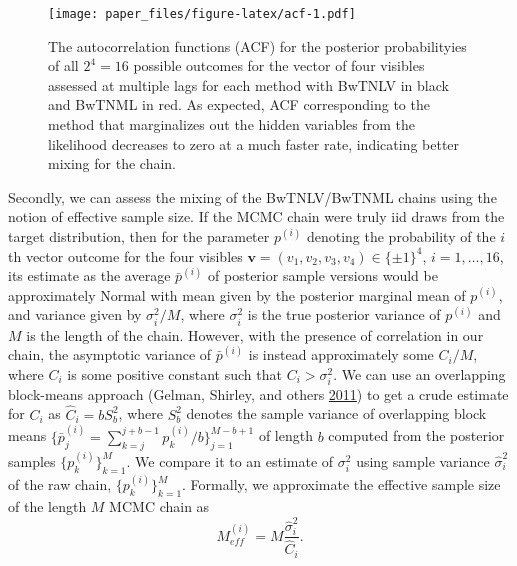 \documentclass[]{article}
\theoremstyle{definition}
\begin{document}
\par
\begin{figure}
\centering
\texttt{[image: paper\_files/figure-latex/acf-1.pdf]}
\caption{\label{fig:acf}The autocorrelation functions (ACF) for the
posterior probabilityies of all \(2^4 = 16\) possible outcomes for the
vector of four visibles assessed at multiple lags for each method with
BwTNLV in black and BwTNML in red. As expected, ACF corresponding to the
method that marginalizes out the hidden variables from the likelihood
decreases to zero at a much faster rate, indicating better mixing for
the chain.}
\end{figure}
Secondly, we can assess the mixing of the BwTNLV/BwTNML chains using the
notion of effective sample size. If the MCMC chain were truly iid draws
from the target distribution, then for the parameter \(p^{(i)}\)
denoting the probability of the \(i\)th vector outcome for the four
visibles \(\mathbf{v}=(v_1,v_2,v_3,v_4)\in\{\pm 1\}^4\),
\(i=1,\ldots,16\), its estimate as the average \(\bar{p}^{(i)}\) of
posterior sample versions would be approximately Normal with mean given
by the posterior marginal mean of \(p^{(i)}\), and variance given by
\(\sigma^2_i/M\), where \(\sigma^2_i\) is the true posterior variance of
\(p^{(i)}\) and \(M\) is the length of the chain. However, with the
presence of correlation in our chain, the asymptotic variance of
\(\bar{p}^{(i)}\) is instead approximately some \(C_i/M\), where \(C_i\)
is some positive constant such that \(C_i > \sigma^2_i\). We can use an
overlapping block-means approach (Gelman, Shirley, and others
\protect\hyperlink{ref-gelman2011inference}{2011}) to get a crude
estimate for \(C_i\) as \(\hat{C}_i = bS_b^2\), where \(S_b^2\) denotes
the sample variance of overlapping block means
\(\{\bar{p}_j^{(i)}=\sum_{k=j}^{j+b-1} p_k^{(i)}/b\}_{j=1}^{M-b+1}\) of
length \(b\) computed from the posterior samples
\(\{p_k^{(i)}\}_{k=1}^M\). We compare it to an estimate of
\(\sigma^2_i\) using sample variance \(\hat{\sigma}^2_i\) of the raw
chain, \(\{p_k^{(i)}\}_{k=1}^{M}\). Formally, we approximate the
effective sample size of the length \(M\) MCMC chain as \[
M_{eff}^{(i)} = M\frac{\hat{\sigma}^2_i}{\hat{C}_i}.
\]
\end{document}
